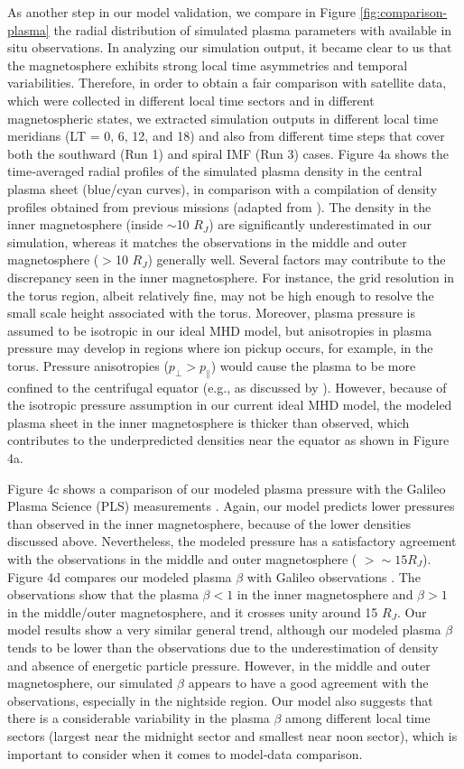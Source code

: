 As another step in our model validation, we compare in Figure \ref{fig:comparison-plasma} the radial distribution of simulated plasma parameters with available in situ observations. In analyzing our simulation output, it became clear to us that the magnetosphere exhibits strong local time asymmetries and temporal variabilities. Therefore, in order to obtain a fair comparison with satellite data, which were collected in different local time sectors and in different magnetospheric states, we extracted simulation outputs in different local time meridians (LT = 0, 6, 12, and 18) and also from different time steps that cover both the southward (Run 1) and spiral IMF (Run 3) cases. Figure 4a shows the time‐averaged radial profiles of the simulated plasma density in the central plasma sheet (blue/cyan curves), in comparison with a compilation of density profiles obtained from previous missions (adapted from ). The density in the inner magnetosphere (inside $\sim$10 $R_J$) are significantly underestimated in our simulation, whereas it matches the observations in the middle and outer magnetosphere ($>$10 $R_J$) generally well. Several factors may contribute to the discrepancy seen in the inner magnetosphere. For instance, the grid resolution in the torus region, albeit relatively fine, may not be high enough to resolve the small scale height associated with the torus. Moreover, plasma pressure is assumed to be isotropic in our ideal MHD model, but anisotropies in plasma pressure may develop in regions where ion pickup occurs, for example, in the torus. Pressure anisotropies ($p_\perp > p_\parallel$) would cause the plasma to be more confined to the centrifugal equator (e.g., as discussed by ). However, because of the isotropic pressure assumption in our current ideal MHD model, the modeled plasma sheet in the inner magnetosphere is thicker than observed, which contributes to the underpredicted densities near the equator as shown in Figure 4a. 

Figure 4c shows a comparison of our modeled plasma pressure with the Galileo Plasma Science (PLS) measurements \cite{Frank2002}. Again, our model predicts lower pressures than observed in the inner magnetosphere, because of the lower densities discussed above. Nevertheless, the modeled pressure has a satisfactory agreement with the observations in the middle and outer magnetosphere ( $ >\sim15 R_J$). Figure 4d compares our modeled plasma $\beta$ with Galileo observations \cite{Mauk2004}. The observations show that the plasma $\beta < 1$ in the inner magnetosphere and $\beta > 1$ in the middle/outer magnetosphere, and it crosses unity around 15 $R_J$. Our model results show a very similar general trend, although our modeled plasma $\beta$ tends to be lower than the observations due to the underestimation of density and absence of energetic particle pressure. However, in the middle and outer magnetosphere, our simulated $\beta$ appears to have a good agreement with the observations, especially in the nightside region. Our model also suggests that there is a considerable variability in the plasma $\beta$ among different local time sectors (largest near the midnight sector and smallest near noon sector), which is important to consider when it comes to model‐data comparison. 

